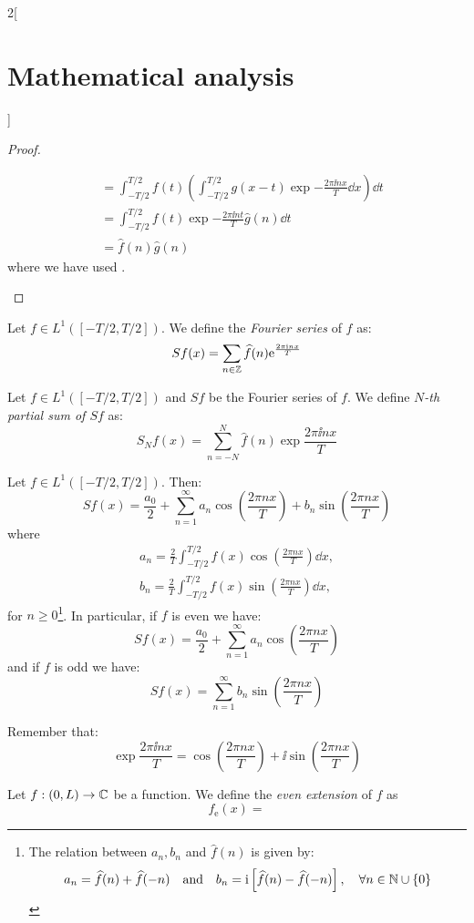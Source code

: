 \documentclass[../../../main_math.tex]{subfiles}
\begin{document}
\begin{multicols}{2}[\section{Mathematical analysis}]
\begin{proof}
\begin{enumerate}
\begin{align*}
                                 & =\int_{-T/2}^{T/2}f(t)\left(\int_{-T/2}^{T/2} g(x-t)\exp{-\frac{2\pi\ii n x}{T}}\dd{x}\right)\dd{t} \\
                                 & =\int_{-T/2}^{T/2}f(t)\exp{-\frac{2\pi\ii nt}{T}}\widehat{g}(n)\dd{t}                               \\
                                 & =\widehat{f}(n)\widehat{g}(n)
            \end{align*}
            where we have used .
    \end{enumerate}
  \end{proof}
  \begin{definition}
    Let $f\in L^1([-T/2,T/2])$. We define the \emph{Fourier series} of $f$ as: $$\displaystyle Sf(x)=\sum_{n\in\mathbb{Z} }\widehat{f}(n)\mathrm{e}^{\frac{2\pi\mathrm{i} nx}{T}}$$
  \end{definition}
  \begin{definition}
    Let $f\in L^1([-T/2,T/2])$ and $Sf$ be the Fourier series of $f$. We define \emph{$N$-th partial sum of $Sf$} as: $$S_Nf(x)=\sum_{n=-N}^N\widehat{f}(n)\exp{\frac{2\pi\ii nx}{T}}$$
  \end{definition}
  \begin{proposition}
    Let $f\in L^1([-T/2,T/2])$. Then: $$Sf(x)=\frac{a_0}{2}+\sum_{n=1}^\infty a_n\cos\left(\frac{2\pi nx}{T}\right)+b_n\sin\left(\frac{2\pi nx}{T}\right)$$ where \begin{gather*}
      a_n=\frac{2}{T}\int_{-T/2}^{T/2}f(x)\cos\left(\frac{2\pi nx}{T}\right)\dd{x},\\ b_n=\frac{2}{T}\int_{-T/2}^{T/2}f(x)\sin\left(\frac{2\pi nx}{T}\right)\dd{x},
    \end{gather*} for $n\geq 0$\footnote{The relation between $a_n,b_n$ and $\widehat{f}(n)$ is given by: $$a_n=\widehat{f}(n)+\widehat{f}(-n)\quad\text{and}\quad b_n=\mathrm{i}\left[\widehat{f}(n)-\widehat{f}(-n)\right],\quad\forall n\in\mathbb{N} \cup\{0\}$$}. In particular, if $f$ is even we have: $$Sf(x)=\frac{a_0}{2}+\sum_{n=1}^\infty a_n\cos\left(\frac{2\pi nx}{T}\right)$$ and if $f$ is odd we have: $$Sf(x)=\sum_{n=1}^\infty b_n\sin\left(\frac{2\pi nx}{T}\right)$$
  \end{proposition}
  \begin{sproof}
    Remember that: $$\exp{\frac{2\pi\ii nx}{T}}=\cos\left(\frac{2\pi nx}{T}\right)+\ii\sin\left(\frac{2\pi nx}{T}\right)$$
  \end{sproof}
  \begin{definition}
    Let $f:(0,L)\rightarrow\mathbb{C} $ be a function. We define the \emph{even extension} of $f$ as $$f_\mathrm{e}(x)=
$$
\end{definition}
\end{multicols}
\end{document}
